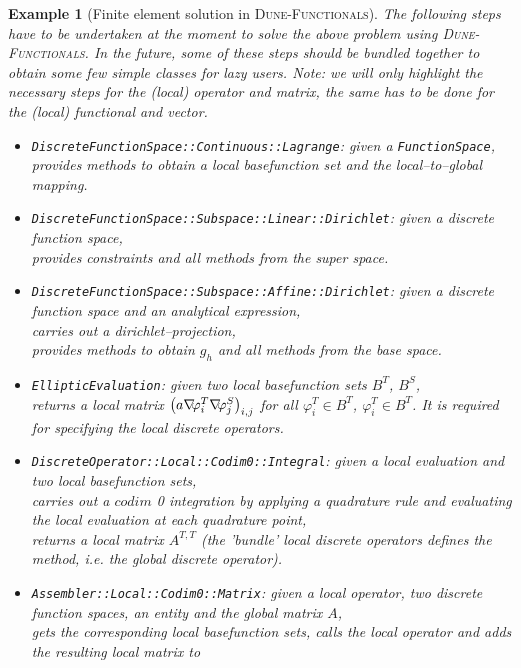 \documentclass[a4paper,11pt]{article}
\numberwithin{equation}{section}
\newtheorem{example}[definition]{Example}
\newcommand{\CodeT}[1]{\textnormal{\texttt{#1}}}
\newcommand{\dunefunctionals}{\textsc{Dune-Functionals}\xspace}
\newcommand{\hnS}{\hspace{-1.25pt}}
\newcommand{\gradient}{\nabla\hnS\hnS}
\begin{document}
\begin{example}[Finite element solution in \dunefunctionals]
	\label{example::discretization::solution_dune_functionals}
	The following steps have to be undertaken at the moment to solve the above problem using \dunefunctionals.
	In the future, some of these steps should be bundled together to obtain some few simple classes for lazy users.
	Note: we will only highlight the necessary steps for the (local) operator and matrix, the same has to be done for the
	(local) functional and vector.
	\begin{itemize}
		\item \CodeT{DiscreteFunctionSpace::Continuous::Lagrange}: given a \CodeT{FunctionSpace},\\
			provides methods to obtain a local basefunction set and the local--to--global mapping.
		\item \CodeT{DiscreteFunctionSpace::Subspace::Linear::Dirichlet}: given a discrete function space,\\
			provides constraints and all methods from the super space.
		\item \CodeT{DiscreteFunctionSpace::Subspace::Affine::Dirichlet}: given a discrete function space and an analytical
			expression,\\
			carries out a dirichlet--projection,\\
			provides methods to obtain $g_h$ and all methods from the base space.
	  \item \CodeT{EllipticEvaluation}: given two local basefunction sets $B^T$, $B^S$,\\
			returns a local matrix ${\big(a \gradient \varphi_i^T \gradient \varphi_j^S\big)_{i,j}}$ for all ${\varphi_i^T \in B^T}$,
			${\varphi_i^T \in B^T}$. It is required for specifying the local discrete operators.
		\item \CodeT{DiscreteOperator::Local::Codim0::Integral}: given a local evaluation and two local basefunction sets,\\
			carries out a $codim$ 0 integration by applying a quadrature rule and evaluating the local evaluation at each quadrature point,\\
			returns a local matrix ${A^{T,T}}$ (the 'bundle' local discrete operators defines the method, i.e. the global discrete operator).
		\item \CodeT{Assembler::Local::Codim0::Matrix}: given a local operator, two discrete function spaces, an entity and
			the global matrix $A$,\\
			gets the corresponding local basefunction sets, calls the local operator and adds the resulting local matrix to

\end{itemize}
\end{example}
\end{document}
